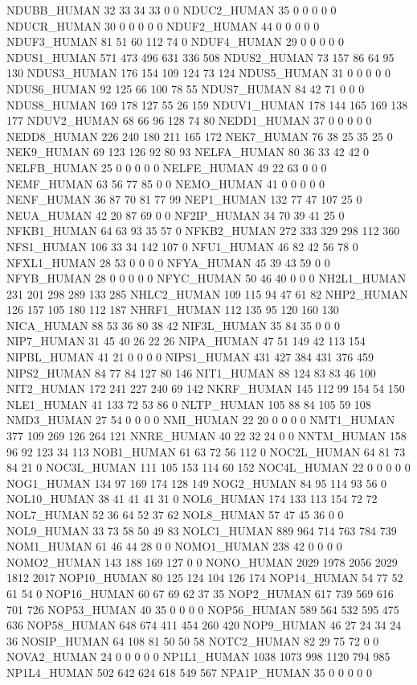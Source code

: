 NDUBB_HUMAN	32	33	34	33	0	0
NDUC2_HUMAN	35	0	0	0	0	0
NDUCR_HUMAN	30	0	0	0	0	0
NDUF2_HUMAN	44	0	0	0	0	0
NDUF3_HUMAN	81	51	60	112	74	0
NDUF4_HUMAN	29	0	0	0	0	0
NDUS1_HUMAN	571	473	496	631	336	508
NDUS2_HUMAN	73	157	86	64	95	130
NDUS3_HUMAN	176	154	109	124	73	124
NDUS5_HUMAN	31	0	0	0	0	0
NDUS6_HUMAN	92	125	66	100	78	55
NDUS7_HUMAN	84	42	71	0	0	0
NDUS8_HUMAN	169	178	127	55	26	159
NDUV1_HUMAN	178	144	165	169	138	177
NDUV2_HUMAN	68	66	96	128	74	80
NEDD1_HUMAN	37	0	0	0	0	0
NEDD8_HUMAN	226	240	180	211	165	172
NEK7_HUMAN	76	38	25	35	25	0
NEK9_HUMAN	69	123	126	92	80	93
NELFA_HUMAN	80	36	33	42	42	0
NELFB_HUMAN	25	0	0	0	0	0
NELFE_HUMAN	49	22	63	0	0	0
NEMF_HUMAN	63	56	77	85	0	0
NEMO_HUMAN	41	0	0	0	0	0
NENF_HUMAN	36	87	70	81	77	99
NEP1_HUMAN	132	77	47	107	25	0
NEUA_HUMAN	42	20	87	69	0	0
NF2IP_HUMAN	34	70	39	41	25	0
NFKB1_HUMAN	64	63	93	35	57	0
NFKB2_HUMAN	272	333	329	298	112	360
NFS1_HUMAN	106	33	34	142	107	0
NFU1_HUMAN	46	82	42	56	78	0
NFXL1_HUMAN	28	53	0	0	0	0
NFYA_HUMAN	45	39	43	59	0	0
NFYB_HUMAN	28	0	0	0	0	0
NFYC_HUMAN	50	46	40	0	0	0
NH2L1_HUMAN	231	201	298	289	133	285
NHLC2_HUMAN	109	115	94	47	61	82
NHP2_HUMAN	126	157	105	180	112	187
NHRF1_HUMAN	112	135	95	120	160	130
NICA_HUMAN	88	53	36	80	38	42
NIF3L_HUMAN	35	84	35	0	0	0
NIP7_HUMAN	31	45	40	26	22	26
NIPA_HUMAN	47	51	149	42	113	154
NIPBL_HUMAN	41	21	0	0	0	0
NIPS1_HUMAN	431	427	384	431	376	459
NIPS2_HUMAN	84	77	84	127	80	146
NIT1_HUMAN	88	124	83	83	46	100
NIT2_HUMAN	172	241	227	240	69	142
NKRF_HUMAN	145	112	99	154	54	150
NLE1_HUMAN	41	133	72	53	86	0
NLTP_HUMAN	105	88	84	105	59	108
NMD3_HUMAN	27	54	0	0	0	0
NMI_HUMAN	22	20	0	0	0	0
NMT1_HUMAN	377	109	269	126	264	121
NNRE_HUMAN	40	22	32	24	0	0
NNTM_HUMAN	158	96	92	123	34	113
NOB1_HUMAN	61	63	72	56	112	0
NOC2L_HUMAN	64	81	73	84	21	0
NOC3L_HUMAN	111	105	153	114	60	152
NOC4L_HUMAN	22	0	0	0	0	0
NOG1_HUMAN	134	97	169	174	128	149
NOG2_HUMAN	84	95	114	93	56	0
NOL10_HUMAN	38	41	41	41	31	0
NOL6_HUMAN	174	133	113	154	72	72
NOL7_HUMAN	52	36	64	52	37	62
NOL8_HUMAN	57	47	45	36	0	0
NOL9_HUMAN	33	73	58	50	49	83
NOLC1_HUMAN	889	964	714	763	784	739
NOM1_HUMAN	61	46	44	28	0	0
NOMO1_HUMAN	238	42	0	0	0	0
NOMO2_HUMAN	143	188	169	127	0	0
NONO_HUMAN	2029	1978	2056	2029	1812	2017
NOP10_HUMAN	80	125	124	104	126	174
NOP14_HUMAN	54	77	52	61	54	0
NOP16_HUMAN	60	67	69	62	37	35
NOP2_HUMAN	617	739	569	616	701	726
NOP53_HUMAN	40	35	0	0	0	0
NOP56_HUMAN	589	564	532	595	475	636
NOP58_HUMAN	648	674	411	454	260	420
NOP9_HUMAN	46	27	24	34	24	36
NOSIP_HUMAN	64	108	81	50	50	58
NOTC2_HUMAN	82	29	75	72	0	0
NOVA2_HUMAN	24	0	0	0	0	0
NP1L1_HUMAN	1038	1073	998	1120	794	985
NP1L4_HUMAN	502	642	624	618	549	567
NPA1P_HUMAN	35	0	0	0	0	0
